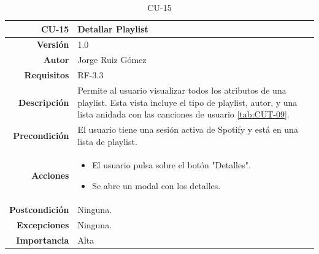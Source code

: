 \begin{table}[H]
    \centering
    \begin{tabular}{r|p{}}
    \hline
    \textbf{CU-15}  & \textbf{Detallar Playlist}                                 \\ \hline
    \textbf{Versión}       & 1.0                                                     \\
    \textbf{Autor}         & Jorge Ruiz Gómez                                        \\
    \textbf{Requisitos}    & RF-3.3                                         \\
    \textbf{Descripción}   & Permite al usuario visualizar todos los atributos de una playlist. Esta vista incluye el tipo de playlist, autor, y una lista anidada con las canciones de usuario \ref{tab:CUT-09}. 
    \\ \hline
    \textbf{Precondición}  & El usuario tiene una sesión activa de Spotify y está en una lista de playlist.\\
    \textbf{Acciones}      &    \begin{itemize}
                                    \item El usuario pulsa sobre el botón "Detalles".
                                    \item Se abre un modal con los detalles.
                                \end{itemize}\\
                                                                              
    \textbf{Postcondición} & Ninguna. \\
    \textbf{Excepciones}   & Ninguna.    \\
    \textbf{Importancia}   & Alta        \\ \hline
    \end{tabular}
    \caption{CU-15}
    \label{tab:CUT-15}
\end{table}


